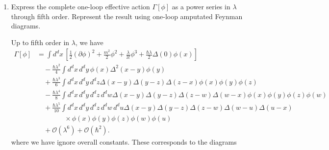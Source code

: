 \begin{enumerate}[label=\alph*)]
    \item Express the complete one-loop effective action $\Gamma[\phi]$ as a
    power series in $\lambda$ through fifth order. Represent the result using
    one-loop amputated Feynman diagrams.
    \begin{solution}
        Up to fifth order in $\lambda$, we have
        \begin{equation}
    \begin{aligned}
        \Gamma[\phi]
        &=\int d^dx\,
        \left[
            \frac{1}{2}(\partial\phi)^2
            +\frac{m^2}{2}\phi^2
            +\frac{\lambda}{3!}\phi^3
            +\frac{\hbar\lambda}{2}\Delta(0)\phi(x)
        \right]\\
        &\quad
        -\frac{\hbar\lambda^2}{4}
        \int d^dx\,d^dy\,
        \phi(x)\Delta^2(x-y)\phi(y)\\
        &\quad
        +\frac{\hbar\lambda^3}{6}
        \int d^dx\,d^dy\,d^dz\Delta(x-y)\Delta(y-z)\Delta(z-x)
        \phi(x)\phi(y)\phi(z)\\
        &\quad
        -\frac{\hbar\lambda^4}{8}
        \int d^dx\,d^dy\,d^dz\,d^dw
        \Delta(x-y)\Delta(y-z)\Delta(z-w)\Delta(w-x)
        \phi(x)\phi(y)\phi(z)\phi(w)\\
        &\quad
        +\frac{\hbar\lambda^5}{10}
        \int d^dx\,d^dy\,d^dz\,d^dw\,d^du
        \Delta(x-y)\Delta(y-z)\Delta(z-w)
        \Delta(w-u)\Delta(u-x)\\
        &\qquad \qquad \times
        \phi(x)\phi(y)\phi(z)\phi(w)\phi(u)\\
        &\quad
        +\mathcal{O}(\lambda^6)+\mathcal{O}(\hbar^2).
    \end{aligned}
    \end{equation}
        where we have ignore overall constants. These corresponds to the diagrams
            \begin{center}
\end{center}
\end{solution}
\end{enumerate}
